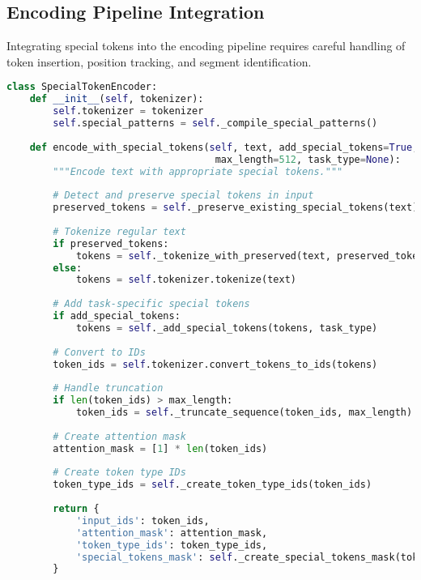 \subsection{Encoding Pipeline Integration}

Integrating special tokens into the encoding pipeline requires careful handling of token insertion, position tracking, and segment identification.

\begin{lstlisting}[language=Python, caption=Special token-aware encoding pipeline]
class SpecialTokenEncoder:
    def __init__(self, tokenizer):
        self.tokenizer = tokenizer
        self.special_patterns = self._compile_special_patterns()
        
    def encode_with_special_tokens(self, text, add_special_tokens=True,
                                    max_length=512, task_type=None):
        """Encode text with appropriate special tokens."""
        
        # Detect and preserve special tokens in input
        preserved_tokens = self._preserve_existing_special_tokens(text)
        
        # Tokenize regular text
        if preserved_tokens:
            tokens = self._tokenize_with_preserved(text, preserved_tokens)
        else:
            tokens = self.tokenizer.tokenize(text)
            
        # Add task-specific special tokens
        if add_special_tokens:
            tokens = self._add_special_tokens(tokens, task_type)
            
        # Convert to IDs
        token_ids = self.tokenizer.convert_tokens_to_ids(tokens)
        
        # Handle truncation
        if len(token_ids) > max_length:
            token_ids = self._truncate_sequence(token_ids, max_length)
            
        # Create attention mask
        attention_mask = [1] * len(token_ids)
        
        # Create token type IDs
        token_type_ids = self._create_token_type_ids(token_ids)
        
        return {
            'input_ids': token_ids,
            'attention_mask': attention_mask,
            'token_type_ids': token_type_ids,
            'special_tokens_mask': self._create_special_tokens_mask(token_ids)
        }
        

\end{lstlisting}

